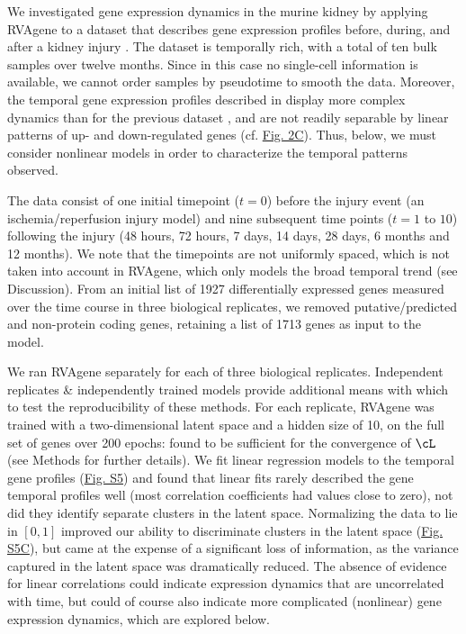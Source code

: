 We investigated gene expression dynamics in the murine kidney by applying RVAgene to a dataset that describes gene expression profiles before, during, and after a kidney injury \citep{liu2017molecular}. The dataset is temporally rich, with a total of ten bulk samples over twelve months. Since in this case no single-cell information is available, we cannot order samples by pseudotime to smooth the data. Moreover, the temporal gene expression profiles described in \citet{liu2017molecular} display more complex dynamics than for the previous dataset \citep{Klein2015}, and are not readily separable by linear patterns of up- and down-regulated genes (cf. \hyperref[fig:fig3]{Fig. 2C}). Thus, below, we must consider nonlinear models in order to characterize the temporal patterns observed.
\par 
The data consist of one initial timepoint ($t = 0$) before the injury event (an ischemia/reperfusion injury model) and nine subsequent time points ($t = 1$ to $10$) following the injury (48 hours, 72 hours, 7 days, 14 days, 28 days, 6 months and 12 months). We note that the timepoints are not uniformly spaced, which is not taken into account in RVAgene, which only models the broad temporal trend (see Discussion). From an initial list of 1927 differentially expressed genes measured over the time course in three biological replicates, we removed putative/predicted and non-protein coding genes, retaining a list of 1713 genes as input to the model.
\par 
We ran RVAgene separately for each of three biological replicates. Independent replicates \& independently trained models provide additional means with which to test the reproducibility of these methods. For each replicate, RVAgene was trained with a two-dimensional latent space and a hidden size of 10, on the full set of genes over 200 epochs: found to be sufficient for the convergence of $\cL$ (see Methods for further details). We fit linear regression models to the temporal gene profiles (\hyperref[supp]{Fig. S5}) and found that linear fits rarely described the gene temporal profiles well (most correlation coefficients had values close to zero), not did they identify separate clusters in the latent space. Normalizing the data to lie in $[0,1]$ improved our ability to discriminate clusters in the latent space (\hyperref[supp]{Fig. S5C}), but came at the expense of a significant loss of information, as the variance captured in the latent space was dramatically reduced. The absence of evidence for linear correlations could indicate expression dynamics that are uncorrelated with time, but could of course also indicate more complicated (nonlinear) gene expression dynamics, which are explored below. 
